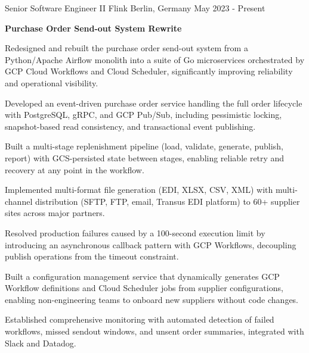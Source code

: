 

\begin{cventries}

  \cventry
    {Senior Software Engineer II} %
    {Flink} %
    {Berlin, Germany} %
    {May 2023 - Present} %
    {
      \begin{cvitems} %
        \item[] {\textbf{Purchase Order Send-out System Rewrite}}
        \item {Redesigned and rebuilt the purchase order send-out system from a Python/Apache Airflow monolith into a suite of Go microservices orchestrated by GCP Cloud Workflows and Cloud Scheduler, significantly improving reliability and operational visibility.}
        \item {Developed an event-driven purchase order service handling the full order lifecycle with PostgreSQL, gRPC, and GCP Pub/Sub, including pessimistic locking, snapshot-based read consistency, and transactional event publishing.}
        \item {Built a multi-stage replenishment pipeline (load, validate, generate, publish, report) with GCS-persisted state between stages, enabling reliable retry and recovery at any point in the workflow.}
        \item {Implemented multi-format file generation (EDI, XLSX, CSV, XML) with multi-channel distribution (SFTP, FTP, email, Transus EDI platform) to 60+ supplier sites across major partners.}
        \item {Resolved production failures caused by a 100-second execution limit by introducing an asynchronous callback pattern with GCP Workflows, decoupling publish operations from the timeout constraint.}
        \item {Built a configuration management service that dynamically generates GCP Workflow definitions and Cloud Scheduler jobs from supplier configurations, enabling non-engineering teams to onboard new suppliers without code changes.}
        \item {Established comprehensive monitoring with automated detection of failed workflows, missed sendout windows, and unsent order summaries, integrated with Slack and Datadog.}

\end{cvitems}}
\end{cventries}
